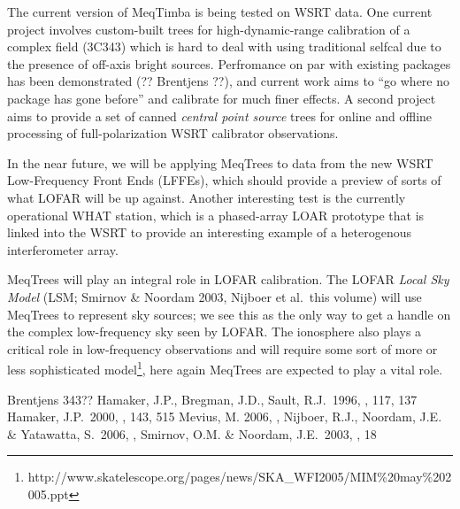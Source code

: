 \documentclass[11pt,twoside]{article}  %
\begin{document}
The current version of MeqTimba is being tested on WSRT data. One current
project involves custom-built trees for high-dynamic-range calibration of a
complex field (3C343) which is hard to deal with using traditional selfcal due
to the presence of off-axis bright sources. Perfromance on par with existing
packages has been demonstrated (?? Brentjens ??), and current work aims to ``go
where no package has gone before'' and calibrate for much finer effects. A
second project aims to provide a set of canned {\em central point source} trees
for online and offline processing of full-polarization WSRT calibrator
observations.

In the near future, we will be applying MeqTrees to data from the new WSRT
Low-Frequency Front Ends (LFFEs), which should provide a preview of sorts of
what LOFAR will be up against. Another interesting test is the currently
operational WHAT station, which is a phased-array LOAR prototype that is linked
into the WSRT to provide an interesting example of a heterogenous interferometer
array.

MeqTrees will play an integral role in LOFAR calibration. The LOFAR {\em Local
Sky Model} (LSM; Smirnov \& Noordam 2003, Nijboer et al.\ this volume) will use
MeqTrees to represent sky sources; we see this as the only way to get a handle
on the complex low-frequency sky seen by LOFAR. The ionosphere also plays a
critical role in low-frequency observations and will require some sort of more
or less sophisticated
model\footnote{http://www.skatelescope.org/pages/news/SKA\_WFI2005/MIM\%20may\%202005.ppt},
here again MeqTrees are expected to play a vital role.

\begin{references}

 Brentjens 343??
 Hamaker, J.P., Bregman, J.D., Sault, R.J.\ 1996, \aaps, 117, 137
 Hamaker, J.P.\ 2000, \aaps, 143, 515
 Mevius, M. 2006, \adassxv, 
 Nijboer, R.J., Noordam, J.E. \& Yatawatta, S.\ 2006, \adassxv,
 Smirnov, O.M. \& Noordam, J.E.\ 2003, \adassxiii, 18

\end{references}
\end{document}
